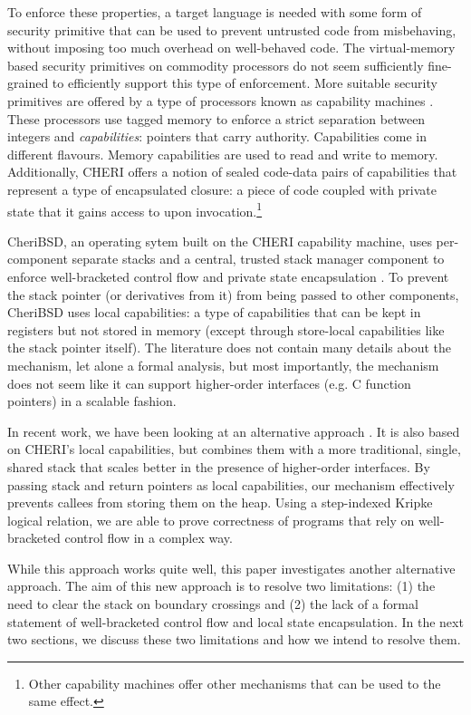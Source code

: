 \documentclass[sigplan, review]{acmart}
\begin{document}
To enforce these properties, a target language is needed with some form of security primitive that can be used to prevent untrusted code from misbehaving, without imposing too much overhead on well-behaved code.
The virtual-memory based security primitives on commodity processors do not seem sufficiently fine-grained to efficiently support this type of enforcement.
More suitable security primitives are offered by a type of processors known as capability machines \citep{levy_capability-based_1984,watson_cheri:_2015}.
These processors use tagged memory to enforce a strict separation between integers and \emph{capabilities}: pointers that carry authority.
Capabilities come in different flavours.
Memory capabilities are used to read and write to memory.
Additionally, CHERI offers a notion of sealed code-data pairs of capabilities that represent a type of encapsulated closure: a piece of code coupled with private state that it gains access to upon invocation.\footnote{Other capability machines offer other mechanisms that can be used to the same effect.} 

CheriBSD, an operating sytem built on the CHERI capability machine, uses per-component separate stacks and a central, trusted stack manager component to enforce well-bracketed control flow and private state encapsulation \citep{watson_cheri:_2015}.
To prevent the stack pointer (or derivatives from it) from being passed to other components, CheriBSD uses local capabilities: a type of capabilities that can be kept in registers but not stored in memory (except through store-local capabilities like the stack pointer itself).
The literature does not contain many details about the mechanism, let alone a formal analysis, but most importantly, the mechanism does not seem like it can support higher-order interfaces (e.g. C function pointers) in a scalable fashion.

In recent work, we have been looking at an alternative approach \citep{skorstengaard_reasoning_nodate}.
It is also based on CHERI's local capabilities, but combines them with a more traditional, single, shared stack that scales better in the presence of higher-order interfaces.
By passing stack and return pointers as local capabilities, our mechanism effectively prevents callees from storing them on the heap.
Using a step-indexed Kripke logical relation, we are able to prove correctness of programs that rely on well-bracketed control flow in a complex way.

While this approach works quite well, this paper investigates another alternative approach.
The aim of this new approach is to resolve two limitations: (1) the need to clear the stack on boundary crossings and (2) the lack of a formal statement of well-bracketed control flow and local state encapsulation.
In the next two sections, we discuss these two limitations and how we intend to resolve them.
\end{document}
